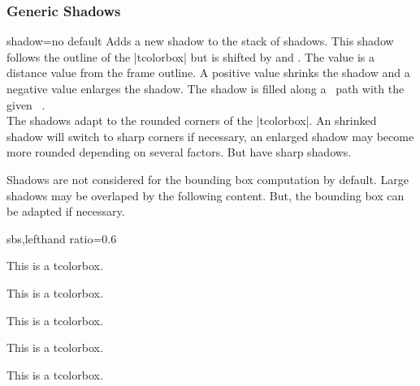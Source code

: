 \clearpage

\subsubsection{Generic Shadows}
\begin{docTcbKey}{shadow}{=}{no default}
  Adds a new shadow to the stack of shadows.
  This shadow follows the outline of the |tcolorbox| but is shifted by
   and . The  value is a distance value
  from the frame outline.  A positive  value shrinks the shadow
  and a negative  value enlarges the shadow.
  The shadow is filled along a \tikzname\  path with the given \tikzname\  .\\
  The shadows adapt to the rounded corners of the |tcolorbox|. An shrinked shadow
  will switch to sharp corners if necessary, an enlarged shadow may become
  more rounded depending on several factors. But 
  have sharp shadows.
  \begin{marker}
  Shadows are not considered for the bounding box computation by default.
  Large shadows may be overlaped by the following content. But, the
  bounding box can be adapted if necessary.
  \end{marker}

\begin{dispExample*}{sbs,lefthand ratio=0.6}

\begin{tcolorbox}[title=My own shadow,
  shadow={2mm}{-1mm}{0mm}{black!50!white}]
This is a tcolorbox.
\end{tcolorbox}
\par\bigskip
\begin{tcolorbox}[title=Another shadow,
  shadow={-1mm}{-2mm}{0mm}{fill=blue,
    opacity=0.5}]
This is a tcolorbox.
\end{tcolorbox}
\par\bigskip
\begin{tcolorbox}[title=Double shadow,
  shadow={-1.5mm}{-1.5mm}{0mm}{fill=blue,
    opacity=0.25},
  shadow={1.5mm}{-1.5mm}{0mm}{fill=red,
    opacity=0.25}]
This is a tcolorbox.
\end{tcolorbox}
\par\bigskip
\begin{tcolorbox}[title=Far shadow,
  shadow={5.5mm}{-3.5mm}{2mm}{fill=black,
    opacity=0.25}]
This is a tcolorbox.
\end{tcolorbox}
\par\bigskip\bigskip
\begin{tcolorbox}[title=Halo shadow,
  shadow={0mm}{0mm}{-1.5mm}%
     {fill=yellow!75!red,opacity=0.5}]
This is a tcolorbox.
\end{tcolorbox}
\end{dispExample*}
\end{docTcbKey}


